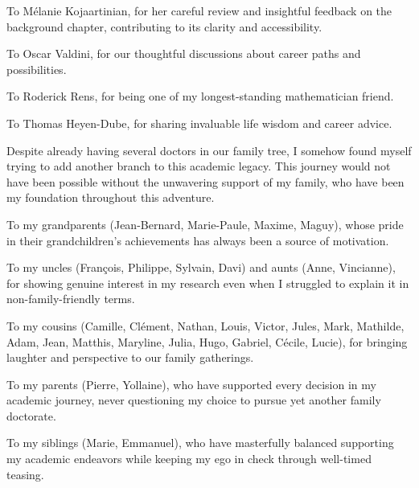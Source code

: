 To Mélanie Kojaartinian, for her careful review and insightful feedback on the background chapter, contributing to its clarity and accessibility.

To Oscar Valdini, for our thoughtful discussions about career paths and possibilities.

To Roderick Rens, for being one of my longest-standing mathematician friend.

To Thomas Heyen-Dube, for sharing invaluable life wisdom and career advice.



Despite already having several doctors in our family tree, I somehow found myself trying to add another branch to this academic legacy.
This journey would not have been possible without the unwavering support of my family, who have been my foundation throughout this adventure.

To my grandparents (Jean-Bernard, Marie-Paule, Maxime, Maguy), whose pride in their grandchildren's achievements has always been a source of motivation.

To my uncles (François, Philippe, Sylvain, Davi) and aunts (Anne, Vincianne), for showing genuine interest in my research even when I struggled to explain it in non-family-friendly terms.

To my cousins (Camille, Clément, Nathan, Louis, Victor, Jules, Mark, Mathilde, Adam, Jean, Matthis, Maryline, Julia, Hugo, Gabriel, Cécile, Lucie), for bringing laughter and perspective to our family gatherings.

To my parents (Pierre, Yollaine), who have supported every decision in my academic journey, never questioning my choice to pursue yet another family doctorate.

To my siblings (Marie, Emmanuel), who have masterfully balanced supporting my academic endeavors while keeping my ego in check through well-timed teasing.



